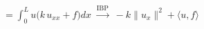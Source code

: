 \documentclass[preview]{standalone}
\begin{document}
\begin{align*}
=\int_0^L u\bigl(k\,u_{xx}+f\bigr)dx\;\xrightarrow{\text{IBP}}\;-k\|u_x\|^2+\langle u,f\rangle
\end{align*}
\end{document}
